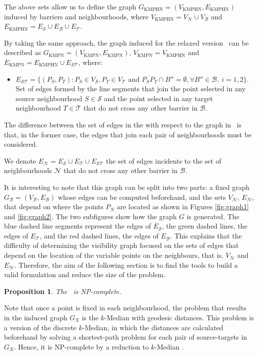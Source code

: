 \documentclass[a4paper,  review, authoryear, 1p.]{elsarticle}
\newcommand{\KMPHN}{{\sf{H-KMPHN}}}
\newcommand{\KMPN}{{\sf{H-KMPN}\xspace }}
\newcommand{\B}{{\mathcal B}}
\newcommand{\VB}{{V^{}_{\mathcal B}}}
\newcommand{\EB}{{E^{}_{\mathcal B}}}
\newcommand{\VS}{{V^{}_{\mathcal S}}}
\newcommand{\ES}{{E^{}_{\mathcal S}}}
\newcommand{\VT}{{V^{}_{\mathcal T}}}
\newcommand{\ET}{{E^{}_{\mathcal T}}}
\newcommand{\VN}{{V^{}_{\mathcal N}}}
\newcommand{\EN}{{E^{}_{\mathcal N}}}
\newcommand{\EST}{{E^{}_{\mathcal S\mathcal T}}}
\newcommand{\GKMPHN}{{G_{\text{KMPHN}}}}
\newcommand{\VKMPHN}{{V_{\text{KMPHN}}}}
\newcommand{\EKMPHN}{{E_{\text{KMPHN}}}}
\newcommand{\GKMPN}{{G_{\text{KMPN}}}}
\newcommand{\VKMPN}{{V_{\text{KMPN}}}}
\newcommand{\EKMPN}{{E_{\text{KMPN}}}}
\newtheorem{prop}{Proposition}
\begin{document}
	The above sets allow us to define the graph $\GKMPHN= (\VKMPHN, \EKMPHN)$ induced by barriers and neighbourhoods, where $\VKMPHN=\VN\cup\VB$ and $\EKMPHN=\ES\cup\EB\cup\ET$. 
	
	By taking the same approach, the graph induced for the relaxed version \KMPN \ can be described as $\GKMPN= (\VKMPN, \EKMPN)$, $\VKMPN= \VKMPHN$ and $\EKMPN=\EKMPHN\cup \EST$, where:
	\begin{itemize}
		\item $\EST=\{(P_S, P_T):P_S\in\VS, P_T\in\VT \text{ and } \overline{P_SP_T}\cap B''=\emptyset,\forall B''\in\B,\:i=1,2\}$. Set of edges formed by the line segments that join the point selected in any source neighbourhood $S\in \mathcal{S}$ and the point selected in any target neighbourhood $T\in \mathcal{T}$ that do not cross any other barrier in $\B$.
	\end{itemize}
	
	The difference between the set of edges in the \KMPHN \xspace with respect to the graph in \KMPN \ is that, in the former case, the edges that join each pair of neighbourhoods must be considered.
	
	We denote $\EN=\ES\cup\ET\cup\EST$ the set of edges incidents to the set of neighbourhoods $\mathcal N$ that do not cross any other barrier in $\B$.
	
	It is interesting to note that this graph can be split into two parts: a fixed graph $G_\B=(\VB,\EB)$ whose edges can be computed beforehand, and the sets $\VN$, $\EN$, that depend on where the points $P_N$ are located as shown in Figures \ref{fig:graph1} and \ref{fig:graph2}.  The two subfigures show how the graph $G$ is generated. The blue dashed line segments represent the edges of $\ES$, the green dashed lines, the edges of $\ET$, and the red dashed lines, the edges of $\EB$. This explains that the difficulty of determining the visibility graph focused on the sets of edges that depend on the location of the variable points on the neighbours, that is, $\VN$ and $\EN$. Therefore, the aim of the following section is to find the tools to build a valid formulation and reduce the size of the problem.

	
	
	\begin{prop}
		The \KMPN \ is NP-complete.
	\end{prop}
		
	Note that once a point is fixed in each neighbourhood, the problem that results in the induced graph $G_X$ is the $k$-Median with geodesic distances. This problem is a version of the discrete $k$-Median, in which the distances are calculated beforehand by solving a shortest-path problem for each pair of source-targets in $G_X$. Hence, it is NP-complete by a reduction to $k$-Median \citep{kariv1979}.
	
\end{document}
